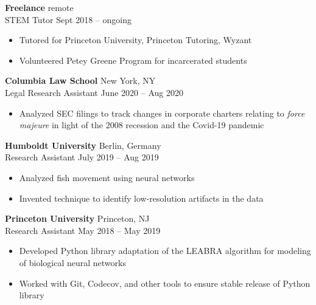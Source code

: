 \documentclass[12pt]{article}
\newcommand{\entry}[4]{{{\textbf{#1}}} \hfill #3 \\ #2 \hfill #4}
\begin{document}
\begin{paracol}{2}
\smallskip

\entry{Freelance}{STEM Tutor}{remote}{Sept 2018 -- ongoing}
\begin{itemize}[noitemsep,leftmargin=3.5mm,rightmargin=0mm,topsep=6pt]
  \item Tutored for Princeton University, Princeton Tutoring, Wyzant
  \item Volunteered Petey Greene Program for incarcerated students
\end{itemize}

\smallskip

\entry{Columbia Law School}{Legal Research Assistant}{New York, NY}{June 2020 -- Aug 2020}
\begin{itemize}[noitemsep,leftmargin=3.5mm,rightmargin=0mm,topsep=6pt]
  \item Analyzed SEC filings to track changes in corporate charters relating to \textit{force majeure} in light of the 2008 recession and the Covid-19 pandemic
\end{itemize}

\smallskip

\entry{Humboldt University}{Research Assistant}{Berlin, Germany}{July 2019 -- Aug 2019}
\begin{itemize}[noitemsep,leftmargin=3.5mm,rightmargin=0mm,topsep=6pt]
  \item Analyzed fish movement using neural
networks
  \item Invented technique to identify low-resolution artifacts in the data
\end{itemize}

\smallskip

\entry{Princeton University}{Research Assistant}{Princeton, NJ}{May 2018 -- May 2019}
\begin{itemize}[noitemsep,leftmargin=3.5mm,rightmargin=0mm,topsep=6pt]
  \item Developed Python library adaptation of the LEABRA algorithm for modeling of biological neural networks
  \item Worked with Git, Codecov, and other tools to ensure stable release of Python library
\end{itemize}


\end{paracol}
\end{document}
